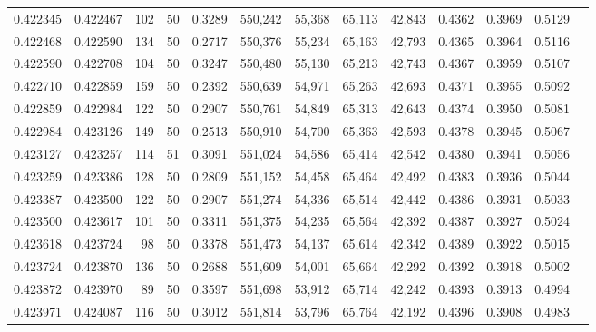 \begin{tabular}{rrrrrrrrrrrrr}
0.422345 & 0.422467 &   102 &  50 &                                     0.3289 & 550,242 &  55,368 &  65,113 &  42,843 & 0.4362 & 0.3969 & 0.5129 \\
0.422468 & 0.422590 &   134 &  50 &                                     0.2717 & 550,376 &  55,234 &  65,163 &  42,793 & 0.4365 & 0.3964 & 0.5116 \\
0.422590 & 0.422708 &   104 &  50 &                                     0.3247 & 550,480 &  55,130 &  65,213 &  42,743 & 0.4367 & 0.3959 & 0.5107 \\
0.422710 & 0.422859 &   159 &  50 &                                     0.2392 & 550,639 &  54,971 &  65,263 &  42,693 & 0.4371 & 0.3955 & 0.5092 \\
0.422859 & 0.422984 &   122 &  50 &                                     0.2907 & 550,761 &  54,849 &  65,313 &  42,643 & 0.4374 & 0.3950 & 0.5081 \\
0.422984 & 0.423126 &   149 &  50 &                                     0.2513 & 550,910 &  54,700 &  65,363 &  42,593 & 0.4378 & 0.3945 & 0.5067 \\
0.423127 & 0.423257 &   114 &  51 &                                     0.3091 & 551,024 &  54,586 &  65,414 &  42,542 & 0.4380 & 0.3941 & 0.5056 \\
0.423259 & 0.423386 &   128 &  50 &                                     0.2809 & 551,152 &  54,458 &  65,464 &  42,492 & 0.4383 & 0.3936 & 0.5044 \\
0.423387 & 0.423500 &   122 &  50 &                                     0.2907 & 551,274 &  54,336 &  65,514 &  42,442 & 0.4386 & 0.3931 & 0.5033 \\
0.423500 & 0.423617 &   101 &  50 &                                     0.3311 & 551,375 &  54,235 &  65,564 &  42,392 & 0.4387 & 0.3927 & 0.5024 \\
0.423618 & 0.423724 &    98 &  50 &                                     0.3378 & 551,473 &  54,137 &  65,614 &  42,342 & 0.4389 & 0.3922 & 0.5015 \\
0.423724 & 0.423870 &   136 &  50 &                                     0.2688 & 551,609 &  54,001 &  65,664 &  42,292 & 0.4392 & 0.3918 & 0.5002 \\
0.423872 & 0.423970 &    89 &  50 &                                     0.3597 & 551,698 &  53,912 &  65,714 &  42,242 & 0.4393 & 0.3913 & 0.4994 \\
0.423971 & 0.424087 &   116 &  50 &                                     0.3012 & 551,814 &  53,796 &  65,764 &  42,192 & 0.4396 & 0.3908 & 0.4983 \\

\end{tabular}

